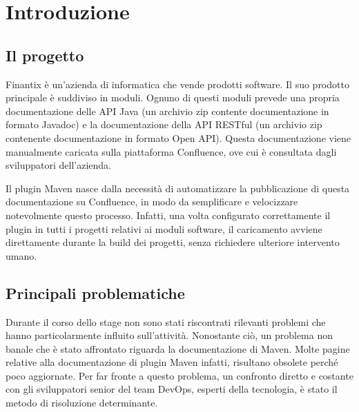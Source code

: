 
\chapter{Introduzione}
\label{cap:introduzione}





\section{Il progetto}
Finantix è un'azienda di informatica che vende prodotti software.
Il suo prodotto principale è suddiviso in moduli.
Ognuno di questi moduli prevede una propria documentazione delle API Java (un archivio zip contente documentazione in formato Javadoc) e la documentazione della API RESTful (un archivio zip contenente documentazione in formato Open API).
Questa documentazione viene manualmente caricata sulla piattaforma Confluence, ove cui è consultata dagli sviluppatori dell'azienda.

Il plugin Maven nasce dalla necessità di automatizzare la pubblicazione di questa documentazione su Confluence, in modo da semplificare e velocizzare notevolmente questo processo.
Infatti, una volta configurato correttamente il plugin in tutti i progetti relativi ai moduli software, il caricamento avviene direttamente durante la build dei progetti, senza richiedere ulteriore intervento umano.

\section{Principali problematiche}
Durante il corso dello stage non sono stati riscontrati rilevanti problemi che hanno particolarmente influito sull'attività.
Nonostante ciò, un problema non banale che è stato affrontato riguarda la documentazione di Maven.
Molte pagine relative alla documentazione di plugin Maven infatti, risultano obsolete perché poco aggiornate.
Per far fronte a questo problema, un confronto diretto e costante con gli sviluppatori senior del team DevOps, esperti della tecnologia, è stato il metodo di risoluzione determinante.


